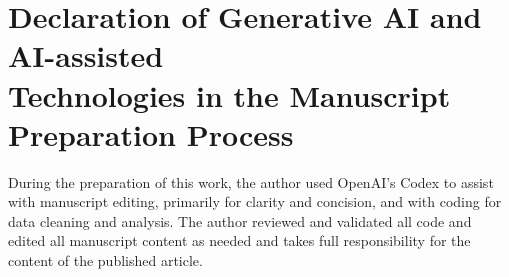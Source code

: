 \section*{Declaration of Generative AI and AI-assisted\\ Technologies in the Manuscript Preparation Process}

During the preparation of this work, the author used OpenAI's Codex to assist with manuscript editing, primarily for clarity and concision, and with coding for data cleaning and analysis. The author reviewed and validated all code and edited all manuscript content as needed and takes full responsibility for the content of the published article.
